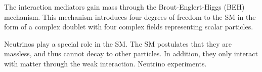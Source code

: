 The interaction mediators gain mass through the Brout-Englert-Higgs (BEH) mechanism.  This mechanism 
introduces four degrees of freedom to the SM in the form of a complex doublet with four complex fields 
representing scalar particles.

Neutrinos play a special role in the SM.  The SM postulates that they are massless, and thus cannot decay 
to other particles.  In addition, they only interact with matter through the weak interaction.  Neutrino 
experiments.

